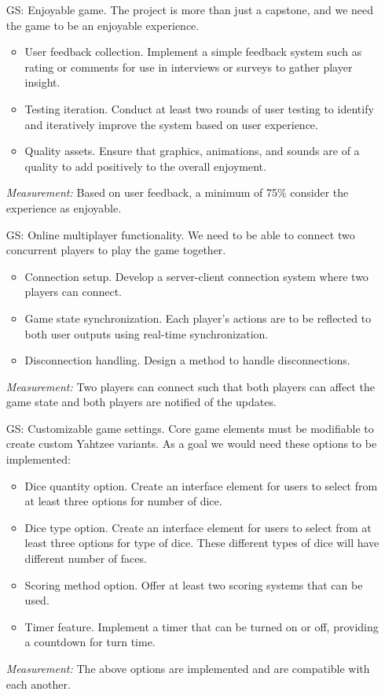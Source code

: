\begin{itemize}

	\item[GS\refstepcounter{goalnum}\thegoalnum \label{G_enjoyable}:] Enjoyable game. The project is more than just a capstone, and we need the game to be an enjoyable experience.
	\begin{itemize}
        \item User feedback collection. Implement a simple feedback system such as rating or comments for use in interviews or surveys to gather player insight.
        \item Testing iteration. Conduct at least two rounds of user testing to identify and iteratively improve the system based on user experience.
        \item Quality assets. Ensure that graphics, animations, and sounds are of a quality to add positively to the overall enjoyment.
    \end{itemize}
	\textit{Measurement:} Based on user feedback, a minimum of 75\% consider the experience as enjoyable.

	\item[GS\refstepcounter{goalnum}\thegoalnum \label{G_multiplayer}:] Online multiplayer functionality. We need to be able to connect two concurrent players to play the game together.
	\begin{itemize}
        \item Connection setup. Develop a server-client connection system where two players can connect.
        \item Game state synchronization. Each player's actions are to be reflected to both user outputs using real-time synchronization.
        \item Disconnection handling. Design a method to handle disconnections.
    \end{itemize}
	\textit{Measurement:} Two players can connect such that both players can affect the game state and both players are notified of the updates.

	\item[GS\refstepcounter{goalnum}\thegoalnum \label{G_customization}:] Customizable game settings. Core game elements must be modifiable to create custom Yahtzee variants. As a goal we would need these options to be implemented:
	\begin{itemize}
        \item Dice quantity option. Create an interface element for users to select from at least three options for number of dice.
        \item Dice type option. Create an interface element for users to select from at least three options for type of dice. These different types of dice will have different number of faces.
        \item Scoring method option. Offer at least two scoring systems that can be used.
        \item Timer feature. Implement a timer that can be turned on or off, providing a countdown for turn time.
    \end{itemize}
	\textit{Measurement:} The above options are implemented and are compatible with each another.
	

\end{itemize}
